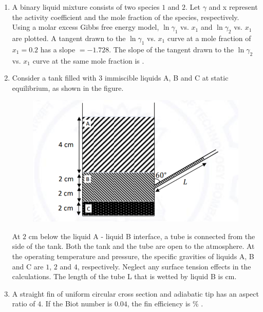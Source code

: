 \documentclass[journal,12pt,onecolumn]{IEEEtran}
\theoremstyle{remark}
\begin{document}
\begin{enumerate}
 

\item A binary liquid mixture consists of two species $1$ and $2$. Let $\gamma$ and x represent the activity coefficient and the mole fraction of the species, respectively. Using a molar excess Gibbs free energy model, $\ln \gamma_{1}$ vs. $x_{1}$ and $\ln \gamma_{2}$ vs. $x_{1}$ are plotted. A tangent drawn to the $\ln \gamma_{1}$ vs. $x_{1}$ curve at a mole fraction of $x_{1}=0.2$ has a slope $=-1.728$. The slope of the tangent drawn to the $\ln \gamma_{2}$ vs. $x_{1}$ curve at the same mole fraction is \underline{\hspace{2cm}} .
\hfill{}

 

\item Consider a tank filled with $3$ immiscible liquids A, B and C at static equilibrium, as shown in the figure.
\begin{figure}[H]
\centering
\includegraphics[width = 0.5\columnwidth]{q41.png}
\caption*{}
\label{fig:q42}
\end{figure}
At $2$ cm below the liquid A - liquid B interface, a tube is connected from the side of the tank. Both the tank and the tube are open to the atmosphere. At the operating temperature and pressure, the specific gravities of liquids A, B and C are $1$, $2$ and $4$, respectively. Neglect any surface tension effects in the calculations. The length of the tube L that is wetted by liquid B is \underline{\hspace{2cm}} cm.
\hfill{}

 

\item A straight fin of uniform circular cross section and adiabatic tip has an aspect ratio  of $4$. If the Biot number  is $0.04$, the fin efficiency is \underline{\hspace{2cm}} \% .
\hfill{}


\end{enumerate}
\end{document}
